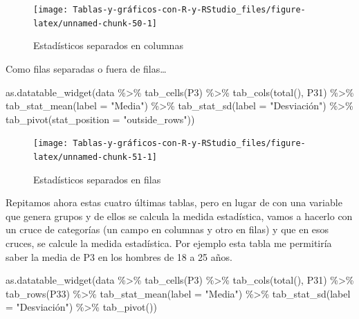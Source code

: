 \documentclass[
]{book}
\newenvironment{Shaded}{\begin{snugshade}}{\end{snugshade}}
\newcommand{\AttributeTok}[1]{\textcolor[rgb]{0.77,0.63,0.00}{#1}}
\newcommand{\FunctionTok}[1]{\textcolor[rgb]{0.00,0.00,0.00}{#1}}
\newcommand{\NormalTok}[1]{#1}
\newcommand{\SpecialCharTok}[1]{\textcolor[rgb]{0.00,0.00,0.00}{#1}}
\newcommand{\StringTok}[1]{\textcolor[rgb]{0.31,0.60,0.02}{#1}}
\begin{document}
\begin{figure}[H]

{\centering \texttt{[image: Tablas-y-gráficos-con-R-y-RStudio\_files/figure-latex/unnamed-chunk-50-1]} 

}

\caption{Estadísticos separados en columnas}\label{fig:unnamed-chunk-50}
\end{figure}

Como filas separadas o fuera de filas\ldots{}

\begin{Shaded}
\begin{Highlighting}[]
\FunctionTok{as.datatable\_widget}\NormalTok{(data }\SpecialCharTok{\%\textgreater{}\%} \FunctionTok{tab\_cells}\NormalTok{(P3) }\SpecialCharTok{\%\textgreater{}\%} \FunctionTok{tab\_cols}\NormalTok{(}\FunctionTok{total}\NormalTok{(), }
\NormalTok{  P31) }\SpecialCharTok{\%\textgreater{}\%} \FunctionTok{tab\_stat\_mean}\NormalTok{(}\AttributeTok{label =} \StringTok{"Media"}\NormalTok{) }\SpecialCharTok{\%\textgreater{}\%} \FunctionTok{tab\_stat\_sd}\NormalTok{(}\AttributeTok{label =} \StringTok{"Desviación"}\NormalTok{) }\SpecialCharTok{\%\textgreater{}\%} 
  \FunctionTok{tab\_pivot}\NormalTok{(}\AttributeTok{stat\_position =} \StringTok{"outside\_rows"}\NormalTok{))}
\end{Highlighting}
\end{Shaded}

\begin{figure}[H]

{\centering \texttt{[image: Tablas-y-gráficos-con-R-y-RStudio\_files/figure-latex/unnamed-chunk-51-1]} 

}

\caption{Estadísticos separados en filas}\label{fig:unnamed-chunk-51}
\end{figure}

Repitamos ahora estas cuatro últimas tablas, pero en lugar de con una variable que genera grupos y de ellos se calcula la medida estadística, vamos a hacerlo con un cruce de categorías (un campo en columnas y otro en filas) y que en esos cruces, se calcule la medida estadística. Por ejemplo esta tabla me permitiría saber la media de P3 en los hombres de 18 a 25 años.

\begin{Shaded}
\begin{Highlighting}[]
\FunctionTok{as.datatable\_widget}\NormalTok{(data }\SpecialCharTok{\%\textgreater{}\%} \FunctionTok{tab\_cells}\NormalTok{(P3) }\SpecialCharTok{\%\textgreater{}\%} \FunctionTok{tab\_cols}\NormalTok{(}\FunctionTok{total}\NormalTok{(), }
\NormalTok{  P31) }\SpecialCharTok{\%\textgreater{}\%} \FunctionTok{tab\_rows}\NormalTok{(P33) }\SpecialCharTok{\%\textgreater{}\%} \FunctionTok{tab\_stat\_mean}\NormalTok{(}\AttributeTok{label =} \StringTok{"Media"}\NormalTok{) }\SpecialCharTok{\%\textgreater{}\%} 
  \FunctionTok{tab\_stat\_sd}\NormalTok{(}\AttributeTok{label =} \StringTok{"Desviación"}\NormalTok{) }\SpecialCharTok{\%\textgreater{}\%} \FunctionTok{tab\_pivot}\NormalTok{())}
\end{Highlighting}
\end{Shaded}
\end{document}
